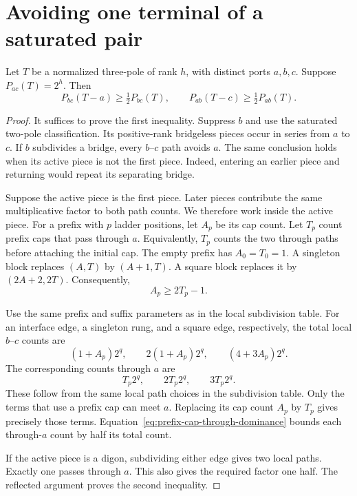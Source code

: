 \section{Avoiding one terminal of a saturated pair}
\label{sec:saturated-terminal-avoidance}

\begin{lemma}
\label{lem:saturated-terminal-avoidance}
Let $T$ be a normalized three-pole of rank $h$, with distinct ports $a,b,c$.
Suppose $P_{ac}(T)=2^h$.
Then
\[
 P_{bc}(T-a)\ge\tfrac12P_{bc}(T),\qquad
 P_{ab}(T-c)\ge\tfrac12P_{ab}(T).
\]
\end{lemma}

\begin{proof}
It suffices to prove the first inequality.
Suppress $b$ and use the saturated two-pole classification.
Its positive-rank bridgeless pieces occur in series from $a$ to $c$.
If $b$ subdivides a bridge, every $b$--$c$ path avoids $a$.
The same conclusion holds when its active piece is not the first piece.
Indeed, entering an earlier piece and returning would repeat its separating bridge.

Suppose the active piece is the first piece.
Later pieces contribute the same multiplicative factor to both path counts.
We therefore work inside the active piece.
For a prefix with $p$ ladder positions, let $A_p$ be its cap count.
Let $T_p$ count prefix caps that pass through $a$.
Equivalently, $T_p$ counts the two through paths before attaching the initial cap.
The empty prefix has $A_0=T_0=1$.
A singleton block replaces $(A,T)$ by $(A+1,T)$.
A square block replaces it by $(2A+2,2T)$.
Consequently,
\begin{equation}\label{eq:prefix-cap-through-dominance}
 A_p\ge2T_p-1.
\end{equation}

Use the same prefix and suffix parameters as in the local subdivision table.
For an interface edge, a singleton rung, and a square edge, respectively, the total local $b$--$c$ counts are
\[
 (1+A_p)2^q,\qquad 2(1+A_p)2^q,\qquad (4+3A_p)2^q.
\]
The corresponding counts through $a$ are
\[
 T_p2^q,\qquad 2T_p2^q,\qquad 3T_p2^q.
\]
These follow from the same local path choices in the subdivision table.
Only the terms that use a prefix cap can meet $a$.
Replacing its cap count $A_p$ by $T_p$ gives precisely those terms.
Equation~\eqref{eq:prefix-cap-through-dominance} bounds each through-$a$ count by half its total count.

If the active piece is a digon, subdividing either edge gives two local paths.
Exactly one passes through $a$.
This also gives the required factor one half.
The reflected argument proves the second inequality.
\end{proof}

